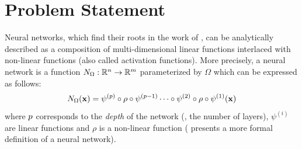 %

\section{Problem Statement}
\label{section:ch1-problem_setting}



Neural networks, which find their roots in the work of \citet{mcculloch1943logical,rosenblatt1958perceptron}, can be analytically described as a composition of multi-dimensional linear functions interlaced with non-linear functions (also called activation functions).
More precisely, a neural network is a function $N_{\Omega} : \mathbb{R}^n \rightarrow \mathbb{R}^m$ parameterized by $\Omega$ which can be expressed as follows:
\begin{equation} \label{equation:ch1-neural_network}
  N_{\Omega}(\mathbf{x}) = \psi^{(p)} \circ \rho \circ \psi^{(p-1)} \cdots \circ \psi^{(2)} \circ \rho \circ \psi^{(1)} (\mathbf{x})
\end{equation}
where $p$ corresponds to the \emph{depth} of the network (\ie, the number of layers), $\psi^{(i)}$ are linear functions and $\rho$ is a non-linear function ( presents a more formal definition of a neural network).


